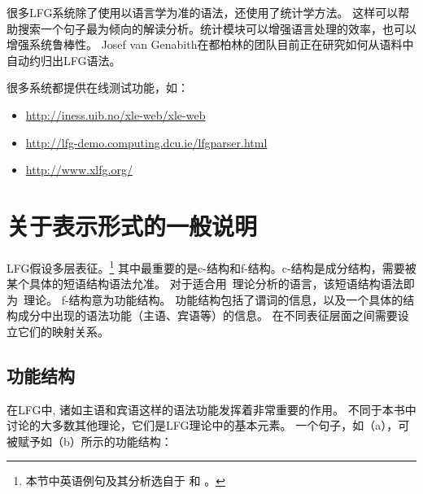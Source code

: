 很多LFG系统除了使用以语言学为准的语法，还使用了统计学方法。
这样可以帮助搜索一个句子最为倾向的解读分析。统计模块可以增强语言处理的效率，也可以增强系统鲁棒性\citep{KRKMVC2004a-u,RKKCMJ2002a-u}。
Josef van Genabith在都柏林的团队目前正在研究如何从语料中自动约归出LFG语法\citep{JGCCR99a-u,DBCGW2005a-u,CBFDRCW2005a-u,CG2006a-u,GWG2007a-u,CBDRGW2008a-u,SvG2009a-u}。

很多系统都提供在线测试功能，如：
\begin{itemize}
\item \url{http://iness.uib.no/xle-web/xle-web}

\item \url{http://lfg-demo.computing.dcu.ie/lfgparser.html}
\item \url{http://www.xlfg.org/}
\end{itemize}

\section{关于表示形式的一般说明}

\label{Abschnitt-Format-LFG}

LFG假设多层表征。\footnote{%
  本节中英语例句及其分析选自于 \citet{Dalrymple2001a-u}和 \citet{Dalrymple2006a}。
}
其中最重要的是c-结构和f-结构。c-结构是成分结构，需要被某个具体的短语结构语法允准。
对于适合用\xbarc~理论分析的语言，该短语结构语法即为\xbarc~理论。
f-结构意为功能结构。
功能结构包括了谓词的信息，以及一个具体的结构成分中出现的语法功能（主语、宾语等）的信息。
在不同表征层面之间需要设立它们的映射关系。

\subsection{功能结构}

在LFG中, 诸如主语和宾语这样的语法功能发挥着非常重要的作用。
不同于本书中讨论的大多数其他理论，它们是LFG理论中的基本元素。
一个句子，如（a），可被赋予如（b）所示的功能结构：

\eal
{}
\ex {}
\zl

